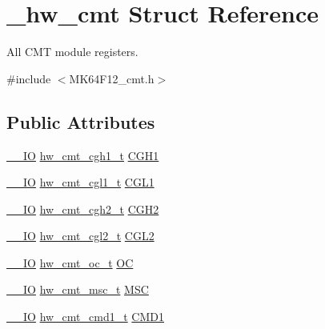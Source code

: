 \hypertarget{struct__hw__cmt}{}\section{\+\_\+hw\+\_\+cmt Struct Reference}
\label{struct__hw__cmt}


All C\+MT module registers.  




{\ttfamily \#include $<$M\+K64\+F12\+\_\+cmt.\+h$>$}

\subsection*{Public Attributes}
\begin{DoxyCompactItemize}
\item 
\hyperlink{core__sc300_8h_aec43007d9998a0a0e01faede4133d6be}{\+\_\+\+\_\+\+IO} \hyperlink{union__hw__cmt__cgh1}{hw\+\_\+cmt\+\_\+cgh1\+\_\+t} \hyperlink{struct__hw__cmt_ac905251f8487858c65f30e24becb98d2}{C\+G\+H1}
\item 
\hyperlink{core__sc300_8h_aec43007d9998a0a0e01faede4133d6be}{\+\_\+\+\_\+\+IO} \hyperlink{union__hw__cmt__cgl1}{hw\+\_\+cmt\+\_\+cgl1\+\_\+t} \hyperlink{struct__hw__cmt_ae95814a0fc234636cf9730648e6e3d96}{C\+G\+L1}
\item 
\hyperlink{core__sc300_8h_aec43007d9998a0a0e01faede4133d6be}{\+\_\+\+\_\+\+IO} \hyperlink{union__hw__cmt__cgh2}{hw\+\_\+cmt\+\_\+cgh2\+\_\+t} \hyperlink{struct__hw__cmt_abcc1e9617a66a0a4bbc7bfc4105250fd}{C\+G\+H2}
\item 
\hyperlink{core__sc300_8h_aec43007d9998a0a0e01faede4133d6be}{\+\_\+\+\_\+\+IO} \hyperlink{union__hw__cmt__cgl2}{hw\+\_\+cmt\+\_\+cgl2\+\_\+t} \hyperlink{struct__hw__cmt_af2e14c5f848ccb0f424d64a14a68c4c8}{C\+G\+L2}
\item 
\hyperlink{core__sc300_8h_aec43007d9998a0a0e01faede4133d6be}{\+\_\+\+\_\+\+IO} \hyperlink{union__hw__cmt__oc}{hw\+\_\+cmt\+\_\+oc\+\_\+t} \hyperlink{struct__hw__cmt_a2e733906f9aa3d944a7a7e431f25fd93}{OC}
\item 
\hyperlink{core__sc300_8h_aec43007d9998a0a0e01faede4133d6be}{\+\_\+\+\_\+\+IO} \hyperlink{union__hw__cmt__msc}{hw\+\_\+cmt\+\_\+msc\+\_\+t} \hyperlink{struct__hw__cmt_ada00f667a324781250373a8fce1f4c85}{M\+SC}
\item 
\hyperlink{core__sc300_8h_aec43007d9998a0a0e01faede4133d6be}{\+\_\+\+\_\+\+IO} \hyperlink{union__hw__cmt__cmd1}{hw\+\_\+cmt\+\_\+cmd1\+\_\+t} \hyperlink{struct__hw__cmt_a579702b8e9eb5f4a1b57652f296267f4}{C\+M\+D1}

\end{DoxyCompactItemize}
